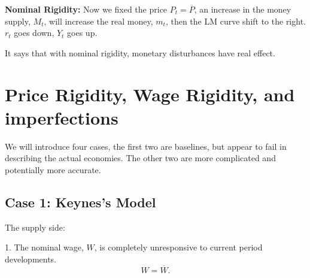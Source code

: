 \documentclass[12pt]{article}
\begin{document}
\begin{figure}[H]
\end{figure}

{\textbf {Nominal Rigidity:}}
Now we fixed the price $ P_{t} =  \overline{P} $, an increase in the money supply,
$ M_{t} $, will increase the real money, $ m_{t} $, then the LM curve shift to the 
right. $ r_{t} $ goes down, $ Y_{t} $ goes up.

It says that with nominal rigidity, monetary disturbances have real effect.



\section{Price Rigidity, Wage Rigidity, and imperfections}
We will introduce four cases, the first two are baselines, but appear to fail
in describing the actual economies. The other two are more complicated and potentially
more accurate.
\subsection{Case 1: Keynes's Model}
The supply side: 

1. The nominal wage, $ W $, is completely unresponsive to current period developments.
\begin{equation*}
W =  \overline{W}.
\end{equation*}
\end{document}
